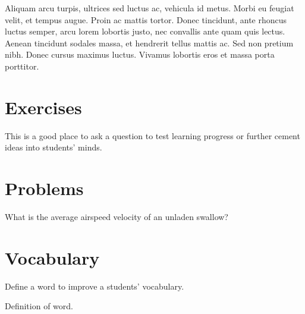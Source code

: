 \documentclass[
	11pt,
	fleqn,
	a4paper,
]{LegrandOrangeBook}
\begin{document}
\begin{example}[Example name] %
    Aliquam arcu turpis, ultrices sed luctus ac, vehicula id metus. Morbi eu feugiat velit, et tempus augue. Proin ac mattis tortor. Donec tincidunt, ante rhoncus luctus semper, arcu lorem lobortis justo, nec convallis ante quam quis lectus. Aenean tincidunt sodales massa, et hendrerit tellus mattis ac. Sed non pretium nibh. Donec cursus maximus luctus. Vivamus lobortis eros et massa porta porttitor.
\end{example}


\section{Exercises}

\begin{exercise} %
    This is a good place to ask a question to test learning progress or further cement ideas into students' minds.
\end{exercise}


\section{Problems}

\begin{problem} %
What is the average airspeed velocity of an unladen swallow?
\end{problem}


\section{Vocabulary}

Define a word to improve a students' vocabulary.

\begin{vocabulary}[Word] %
    Definition of word.
\end{vocabulary}
\end{document}
